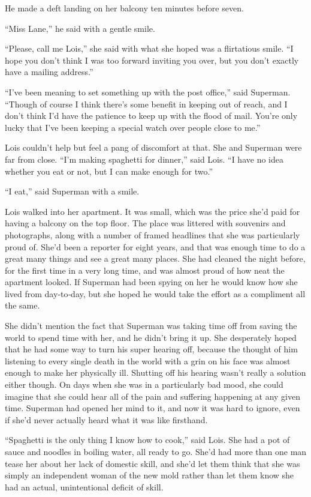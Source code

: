 He made a deft landing on her balcony ten minutes before seven.

``Miss Lane,'' he said with a gentle smile.

``Please, call me Lois,'' she said with what she hoped was a flirtatious
smile. ``I hope you don't think I was too forward inviting you over, but
you don't exactly have a mailing address.''

``I've been meaning to set something up with the post office,'' said
Superman. ``Though of course I think there's some benefit in keeping out
of reach, and I don't think I'd have the patience to keep up with the
flood of mail. You're only lucky that I've been keeping a special watch
over people close to me.''

Lois couldn't help but feel a pang of discomfort at that. She and
Superman were far from close. ``I'm making spaghetti for dinner,'' said
Lois. ``I have no idea whether you eat or not, but I can make enough for
two.''

``I eat,'' said Superman with a smile.

Lois walked into her apartment. It was small, which was the price she'd
paid for having a balcony on the top floor. The place was littered with
souvenirs and photographs, along with a number of framed headlines that
she was particularly proud of. She'd been a reporter for eight years,
and that was enough time to do a great many things and see a great many
places. She had cleaned the night before, for the first time in a very
long time, and was almost proud of how neat the apartment looked. If
Superman had been spying on her he would know how she lived from
day‐to‐day, but she hoped he would take the effort as a compliment all
the same.

She didn't mention the fact that Superman was taking time off from
saving the world to spend time with her, and he didn't bring it up. She
desperately hoped that he had some way to turn his super hearing off,
because the thought of him listening to every single death in the world
with a grin on his face was almost enough to make her physically ill.
Shutting off his hearing wasn't really a solution either though. On days
when she was in a particularly bad mood, she could imagine that she
could hear all of the pain and suffering happening at any given time.
Superman had opened her mind to it, and now it was hard to ignore, even
if she'd never actually heard what it was like firsthand.

``Spaghetti is the only thing I know how to cook,'' said Lois. She had a
pot of sauce and noodles in boiling water, all ready to go. She'd had
more than one man tease her about her lack of domestic skill, and she'd
let them think that she was simply an independent woman of the new mold
rather than let them know she had an actual, unintentional deficit of
skill.

